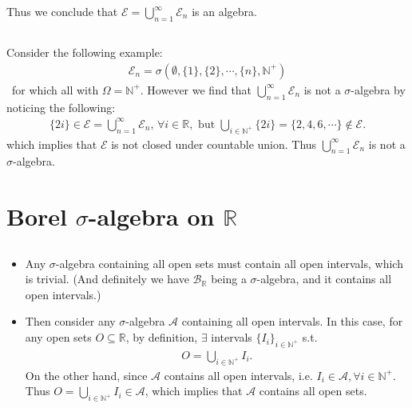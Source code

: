 \documentclass[11pt,a4paper]{article}
\numberwithin{equation}{section}%
\begin{document}
Thus we conclude that $ \mathcal{E}=\bigcup_{n=1}^\infty \mathcal{E}_n $ is an algebra.

\subsection{}


Consider the following example:
\begin{align*}
    \mathcal{E}_n = \sigma (\emptyset, \{1\}, \{2\}, \cdots, \{n\}, \mathbb{N}^+)
\end{align*}\
for which all with $ \Omega =\mathbb{N}^+ $. However we find that $ \bigcup_{n=1}^\infty \mathcal{E}_n $ is not a $ \sigma $-algebra by noticing the following:
\begin{align*}
    \{2i\} \in  \mathcal{E}=\bigcup_{n=1}^\infty \mathcal{E}_n,\,\forall i\in\mathbb{R},\text{ but } \bigcup_{i\in \mathbb{N}^+} \{2i\} = \{2,4,6,\cdots\}\notin \mathcal{E}.
\end{align*}
which implies that $ \mathcal{E} $ is not closed under countable union. Thus $ \bigcup_{n=1}^\infty \mathcal{E}_n $ is not a $ \sigma $-algebra.




\section{Borel $ \sigma  $-algebra on $ \mathbb{R} $}

\subsection{}\label{openintervals}

\begin{itemize}[topsep=2pt,itemsep=0pt]
    \item Any $ \sigma $-algebra containing all open sets must contain all open intervals, which is trivial. (And definitely we have $ \mathcal{B}_\mathbb{R} $ being a $ \sigma $-algebra, and it contains all open intervals.)
    \item Then consider any $ \sigma $-algebra $ \mathcal{A} $ containing all open intervals. In this case, for any open sets $ O \subseteq \mathbb{R} $, by definition, $ \exists $ intervals $ \{I_i\}_{i\in\mathbb{N}^+} $ s.t.
    \begin{align*}
        O=\bigcup_{i\in \mathbb{N}^+} I_i. 
    \end{align*}
    On the other hand, since $ \mathcal{A} $ contains all open intervals, i.e. $ I_i\in \mathcal{A}, \forall i\in \mathbb{N}^+ $. Thus $ O = \bigcup_{i\in \mathbb{N}^+} I_i\in \mathcal{A} $, which implies that $ \mathcal{A} $ contains all open sets. 
\end{itemize}
\end{document}
